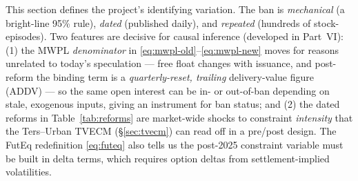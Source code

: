 \begin{takeaway}
This section defines the project's identifying variation. The ban is \emph{mechanical} (a bright-line 95\% rule), \emph{dated} (published daily), and \emph{repeated} (hundreds of stock-episodes). Two features are decisive for causal inference (developed in Part~VI): (1) the MWPL \emph{denominator} in \eqref{eq:mwpl-old}--\eqref{eq:mwpl-new} moves for reasons unrelated to today's speculation --- free float changes with issuance, and post-reform the binding term is a \emph{quarterly-reset, trailing} delivery-value figure (ADDV) --- so the same open interest can be in- or out-of-ban depending on stale, exogenous inputs, giving an instrument for ban status; and (2) the dated reforms in Table~\ref{tab:reforms} are market-wide shocks to constraint \emph{intensity} that the Ters--Urban TVECM (\S\ref{sec:tvecm}) can read off in a pre/post design. The FutEq redefinition \eqref{eq:futeq} also tells us the post-2025 constraint variable must be built in delta terms, which requires option deltas from settlement-implied volatilities.
\end{takeaway}
